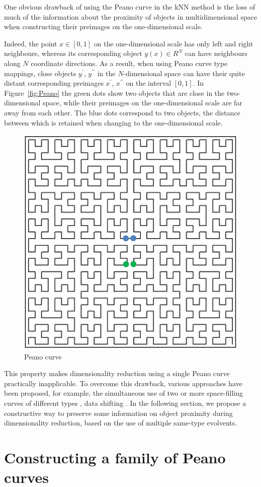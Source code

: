 \documentclass[entropy,article,submit,moreauthors,pdftex]{Definitions/mdpi}
\begin{document}
One obvious drawback of using the Peano curve in the kNN method is the loss of much of the information about the proximity of objects in multidimensional space when constructing their preimages on the one-dimensional scale. 

Indeed, the point $x \in [0,1]$ on the one-dimensional scale has only left and right neighbours, whereas its corresponding object $y(x) \in R^N$ can have neighbours along $N$ coordinate directions. As a result, when using Peano curve type mappings, close objects $y^\prime$, $y^{\prime\prime}$ in the $N$-dimensional space can have their quite distant corresponding preimages $x^\prime$, $x^{\prime\prime}$ on the interval $[0,1]$. In Figure~\ref{fig:Peano} the green dots show two objects that are close in the two-dimensional space, while their preimages on the one-dimensional scale are far away from each other. The blue dots correspond to two objects, the distance between which is retained when changing to the one-dimensional scale.

\begin{figure}
\center
\includegraphics[width=0.5\linewidth]{fig1.png}
\caption{Peano curve}\label{fig:Peano}
\label{fig1}
\end{figure}   

This property makes dimensionality reduction using a single Peano curve practically inapplicable. To overcome this drawback, various approaches have been proposed, for example, the simultaneous use of two or more space-filling curves of different types \cite{Scott1999}, data shifting \cite{Liao2001}. In the following section, we propose a constructive way to preserve some information on object proximity during dimensionality reduction, based on the use of multiple same-type evolvents.

\section{Constructing a family of Peano curves}\label{MPeano}
\end{document}
